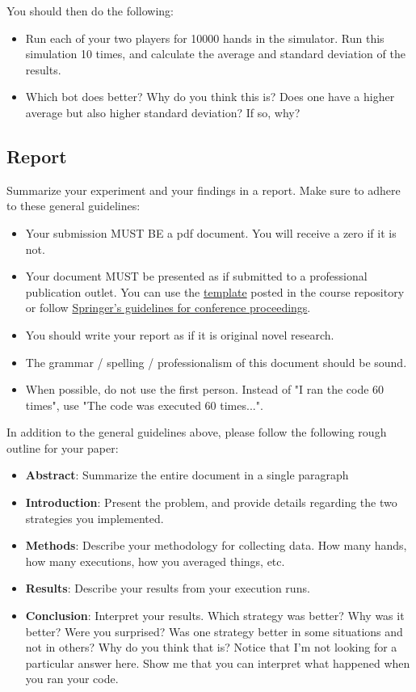 \documentclass[paper=a4, fontsize=11pt, parskip=full]{scrartcl} %
\numberwithin{equation}{section} %
\numberwithin{figure}{section} %
\numberwithin{table}{section} %
\begin{document}
You should then do the following:

\begin{itemize}
	\item Run each of your two players for 10000 hands in the simulator. Run this simulation 10 times, and calculate the average and standard deviation of the results.
	\item Which bot does better? Why do you think this is? Does one have a higher average but also higher standard deviation? If so, why?
\end{itemize}

\subsection{Report}

Summarize your experiment and your findings in a report. Make sure to adhere to these general guidelines:

\begin{itemize}
	\item Your submission MUST BE a pdf document. You will receive a zero if it is not.
	\item Your document MUST be presented as if submitted to a professional publication outlet. You can use the \href{https://github.com/markfloryan/dsa1}{template} posted in the course repository or follow \href{https://www.springer.com/us/computer-science/lncs/conference-proceedings-guidelines}{Springer's guidelines for conference proceedings}.
	\item You should write your report as if it is original novel research.
	\item The grammar / spelling / professionalism of this document should be sound.
	\item When possible, do not use the first person. Instead of "I ran the code 60 times", use "The code was executed 60 times...".
\end{itemize}

In addition to the general guidelines above, please follow the following rough outline for your paper:

\begin{itemize}
	\item \textbf{Abstract}: Summarize the entire document in a single paragraph
	\item \textbf{Introduction}: Present the problem, and provide details regarding the two strategies you implemented.
	\item \textbf{Methods}: Describe your methodology for collecting data. How many hands, how many executions, how you averaged things, etc.
	\item \textbf{Results}: Describe your results from your execution runs.
	\item \textbf{Conclusion}: Interpret your results. Which strategy was better? Why was it better? Were you surprised? Was one strategy better in some situations and not in others? Why do you think that is? Notice that I'm not looking for a particular answer here. Show me that you can interpret what happened when you ran your code.
\end{itemize}
\end{document}
